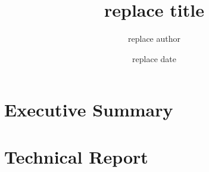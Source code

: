\documentclass{report}
\title{replace title}
\author{replace author}
\date{replace date}
\begin{document}
\maketitle
\tableofcontents
\listoffigures

\chapter{Executive Summary}

\chapter{Technical Report}
\end{document}
